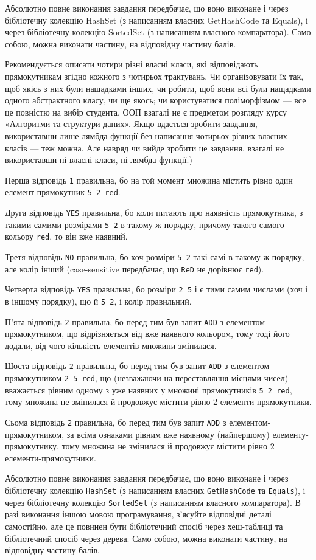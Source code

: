 Абсолютно повне виконання завдання передбачає, що воно виконане і через бібліотечну колекцію HashSet (з написанням власних GetHashCode та Equals), і через бібліотечну колекцію SortedSet (з написанням власного компаратора). Само собою, можна виконати частину, на відповідну частину балів.

Рекомендується описати чотири різні власні класи, які відповідають прямокутникам згідно кожного з чотирьох трактувань. Чи організовувати їх так, щоб якісь з них були нащадками інших, чи робити, щоб вони всі були нащадками одного абстрактного класу, чи ще якось; чи користуватися поліморфізмом — все це повністю на вибір студента. ООП взагалі не є предметом розгляду курсу «Алгоритми та структури даних». Якщо вдасться зробити завдання, використавши лише лямбда-функції без написання чотирьох різних власних класів — теж можна. Але навряд чи вийде зробити це завдання, взагалі не використавши ні власні класи, ні лямбда-функції.) 

Перша відповідь {\tt 1} правильна, бо на той момент множина містить рівно один елемент-прямокутник {\tt 5 2 red}.

Друга відповідь {\tt YES} правильна, бо коли питають про наявність прямокутника, з такими самими розмірами {\tt 5 2} в такому ж порядку, причому такого самого кольору {\tt red}, то він вже наявний.

Третя відповідь {\tt NO} правильна, бо хоч розміри {\tt 5 2} такі самі в такому ж порядку, але колір інший (case-sensitive передбачає, що {\tt ReD} не дорівнює {\tt red}).

Четверта відповідь {\tt YES} правильна, бо розміри {\tt 2 5} і є тими самим числами (хоч і в іншому порядку), що й {\tt 5 2}, і колір правильний.

П'ята відповідь {\tt 2} правильна, бо перед тим був запит {\tt ADD} з елементом-прямокутником, що відрізняється від вже наявного кольором, тому тоді його додали, від чого кількість елементів множини змінилася.

Шоста відповідь {\tt 2} правильна, бо перед тим був запит {\tt ADD} з елементом-прямокутником {\tt 2 5 red}, що (незважаючи на переставляння місцями чисел) вважається рівним одному з уже наявних у множині прямокутників {\tt 5 2 red}, тому множина не змінилася й продовжує містити рівно 2 елементи-прямокутники.

Сьома відповідь {\tt 2} правильна, бо перед тим був запит {\tt ADD} з елементом-прямокутником, за всіма ознаками рівним вже наявному (найпершому) елементу-прямокутнику, тому множина не змінилася й продовжує містити рівно 2 елементи-прямокутники.

Абсолютно повне виконання завдання передбачає, що воно виконане і через бібліотечну колекцію {\tt HashSet} (з написанням власних {\tt GetHashCode} та {\tt Equals}), і через бібліотечну колекцію {\tt SortedSet} (з написанням власного компаратора). В разі виконання іншою мовою програмування, з'ясуйте відповідні деталі самостійно, але це повинен бути бібліотечний спосіб через хеш-таблиці та бібліотечний спосіб через дерева. Само собою, можна виконати частину, на відповідну частину балів. 
